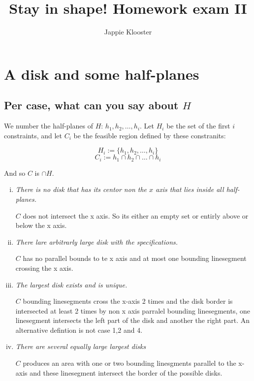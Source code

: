 \documentclass{article}
\begin{document}
\author{Jappie Klooster}
\title{Stay in shape! Homework exam II}
\maketitle
\section{A disk and some half-planes}
\subsection{Per case, what can you say about $H$}
We number the half-planes of $H$: $h_1, h_2,\dots,h_i$.
Let $H_{i}$ be the set of the first $i$ constraints, and
let $C_{i}$ be the feasible region defined by these constranits:

\[ H_i := \{h_1, h_2,\dots, h_i\}\]
\[ C_i := h_1 \cap h_2 \cap \dots \cap h_i\]

And so $C$ is $\cap H$.

\begin{enumerate}[(i)]
	\item \emph{There is no disk that has its centor non the $x$ axis
			that lies inside all half-planes.}

		$C$ does not intersect the x axis. So its either an empty set or entirly above or below the x axis.

	\item \emph{There lare arbitrarly large disk with the specifications.}

		$C$ has no parallel bounds to te x axis and
		at most one bounding linesegment crossing the x axis.

	\item \emph{The largest disk exists and is unique.}

		$C$ bounding linesegments cross the x-axis 2 times and
			the disk border is intersected at least 2 times by non x axis
			parralel bounding linesegments, one linesegment intersects the
			left part of the disk and another the right part.
			An alternative defintion is not case 1,2 and 4.

	\item \emph{There are several equally large largest disks}

		$C$ produces an area with one or two bounding linesgments
		parallel to the x-axis and these linesegment intersect the border
		of the possible disks.

\end{enumerate}
\end{document}
